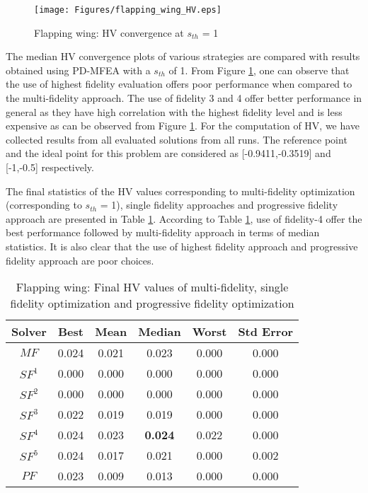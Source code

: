 \begin{figure}[ht]
	\centering
	\texttt{[image: Figures/flapping\_wing\_HV.eps]}
	\caption{Flapping wing: HV convergence at $s_{th}$ = 1}
	\label{fig:flapping_HV_1sigma}
\end{figure}

The median HV convergence plots of various strategies are compared with results obtained using PD-MFEA with a $s_{th}$ of 1. From Figure \ref{fig:flapping_HV_1sigma}, one can observe that the use of highest fidelity evaluation offers poor performance when compared to the multi-fidelity approach. The use of fidelity 3 and 4 offer better performance in general as they have high correlation with the highest fidelity level and is less expensive as can be observed from Figure \ref{fig:flapping_HV_1sigma}. For the computation of HV, we have collected results from all evaluated solutions from all runs. The reference point and the ideal point for this problem are considered as [-0.9411,-0.3519] and [-1,-0.5] respectively. 

The final statistics of the HV values corresponding to multi-fidelity optimization (corresponding to $s_{th}$ = 1), single fidelity approaches and progressive fidelity approach are presented in Table \ref{tab:flapping_HV}. According to Table \ref{tab:flapping_HV}, use of fidelity-4 offer the best performance followed by multi-fidelity approach in terms of median statistics. It is also clear that the use of highest fidelity approach and progressive fidelity approach are  poor choices.  

\begin{table}[!htb]\footnotesize
	\centering
	\caption{Flapping wing: Final HV values of multi-fidelity, single fidelity optimization and progressive fidelity optimization}
	\label{tab:flapping_HV}
	\begin{tabular}{|c|c|c|c|c|c|}
		\noalign{\smallskip}\hline
		Solver& Best &Mean & Median & Worst & Std Error\\ \hline
		$MF$&0.024&0.021&0.023&0.000&0.000\\ \hline
		$SF^1$&0.000&0.000&0.000&0.000&0.000\\ \hline
		$SF^2$&0.000&0.000&0.000&0.000&0.000\\ \hline
		$SF^3$&0.022&0.019&0.019&0.000&0.000\\ \hline
		$SF^4$&0.024&0.023&\textbf{0.024}&0.022&0.000\\ \hline
		$SF^5$&0.024&0.017&0.021&0.000&0.002\\ \hline
		$PF$&0.023&0.009&0.013&0.000&0.000\\ \hline
	\end{tabular}
\end{table}

